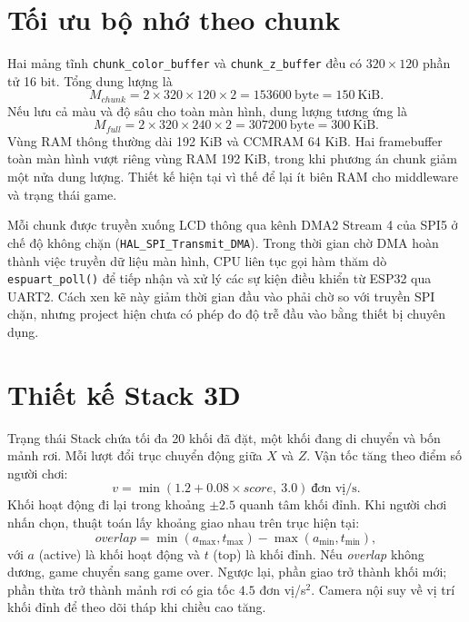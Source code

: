 \section{Tối ưu bộ nhớ theo chunk}

Hai mảng tĩnh \texttt{chunk\_color\_buffer} và \texttt{chunk\_z\_buffer} đều có $320\times120$ phần tử 16 bit. Tổng dung lượng là
\begin{equation}
  M_{chunk}=2\times320\times120\times2=153600\ \text{byte}=150\ \text{KiB}.
  \label{eq:chunk-memory}
\end{equation}
Nếu lưu cả màu và độ sâu cho toàn màn hình, dung lượng tương ứng là
\begin{equation}
  M_{full}=2\times320\times240\times2=307200\ \text{byte}=300\ \text{KiB}.
  \label{eq:full-memory}
\end{equation}
Vùng RAM thông thường dài 192 KiB và CCMRAM 64 KiB. Hai framebuffer toàn màn hình vượt riêng vùng RAM 192 KiB, trong khi phương án chunk giảm một nửa dung lượng. Thiết kế hiện tại vì thế để lại ít biên RAM cho middleware và trạng thái game.

Mỗi chunk được truyền xuống LCD thông qua kênh DMA2 Stream 4 của SPI5 ở chế độ không chặn (\texttt{HAL\_SPI\_Transmit\_DMA}). Trong thời gian chờ DMA hoàn thành việc truyền dữ liệu màn hình, CPU liên tục gọi hàm thăm dò \texttt{espuart\_poll()} để tiếp nhận và xử lý các sự kiện điều khiển từ ESP32 qua UART2. Cách xen kẽ này giảm thời gian đầu vào phải chờ so với truyền SPI chặn, nhưng project hiện chưa có phép đo độ trễ đầu vào bằng thiết bị chuyên dụng.

\section{Thiết kế Stack 3D}

Trạng thái Stack chứa tối đa 20 khối đã đặt, một khối đang di chuyển và bốn mảnh rơi. Mỗi lượt đổi trục chuyển động giữa $X$ và $Z$. Vận tốc tăng theo điểm số người chơi:
\begin{equation}
  v=\min(1.2+0.08\times score,\ 3.0)\ \text{đơn vị/s}.
\end{equation}
Khối hoạt động đi lại trong khoảng $\pm2.5$ quanh tâm khối đỉnh. Khi người chơi nhấn chọn, thuật toán lấy khoảng giao nhau trên trục hiện tại:
\begin{equation}
  overlap=\min(a_{\max},t_{\max})-\max(a_{\min},t_{\min}),
  \label{eq:stack-overlap}
\end{equation}
với $a$ (active) là khối hoạt động và $t$ (top) là khối đỉnh. Nếu \textit{overlap} không dương, game chuyển sang game over. Ngược lại, phần giao trở thành khối mới; phần thừa trở thành mảnh rơi có gia tốc $4.5$ đơn vị/s$^2$. Camera nội suy về vị trí khối đỉnh để theo dõi tháp khi chiều cao tăng.

